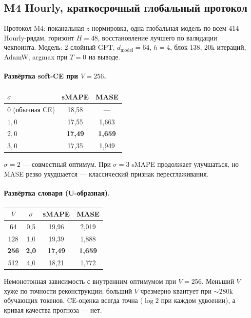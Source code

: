 \documentclass[11pt]{article}
\theoremstyle{remark}
\begin{document}
\subsection{M4 Hourly, краткосрочный глобальный протокол}

Протокол M4: поканальная $z$-нормировка, одна глобальная модель по
всем $414$ Hourly-рядам, горизонт $H = 48$, восстановление лучшего по
валидации чекпоинта. Модель: 2-слойный GPT, $d_{\text{model}} = 64$,
$h = 4$, блок $138$, 20k итераций, AdamW, argmax при $T=0$ на выводе.

\paragraph{Развёртка soft-CE при $V = 256$.}
\begin{center}
\begin{tabular}{lcc}
\toprule
$\sigma$ & sMAPE & MASE \\
\midrule
$0$ (обычная CE) & 18{,}58 & --- \\
$1{,}0$ & 17{,}55 & 1{,}663 \\
$2{,}0$ & \textbf{17{,}49} & \textbf{1{,}659} \\
$3{,}0$ & 17{,}35 & 1{,}949 \\
\bottomrule
\end{tabular}
\end{center}

$\sigma = 2$ --- совместный оптимум. При $\sigma = 3$ sMAPE продолжает
улучшаться, но MASE резко ухудшается --- классический признак
пересглаживания.

\paragraph{Развёртка словаря (U-образная).}
\begin{center}
\begin{tabular}{cccc}
\toprule
$V$ & $\sigma$ & sMAPE & MASE \\
\midrule
64  & 0{,}5 & 19{,}96 & 2{,}019 \\
128 & 1{,}0 & 19{,}39 & 1{,}888 \\
\textbf{256} & \textbf{2{,}0} & \textbf{17{,}49} & \textbf{1{,}659} \\
512 & 4{,}0 & 18{,}21 & 1{,}772 \\
\bottomrule
\end{tabular}
\end{center}

Немонотонная зависимость с внутренним оптимумом при $V = 256$. Меньший
$V$ хуже по точности реконструкции; больший $V$ чрезмерно квантует при
$\sim 280$k обучающих токенов. CE-оценка всегда точна ($\log 2$ при
каждом удвоении), а кривая качества прогноза --- нет.
\end{document}
